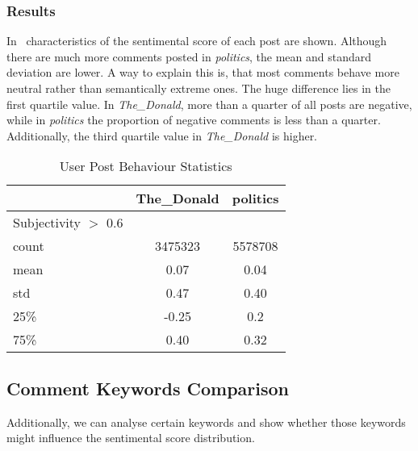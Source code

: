 \documentclass[runningheads,a4paper]{llncs}
\begin{document}
	\subsubsection{Results}
	In~ characteristics of the sentimental score of each post are shown. Although there are much more comments posted in \textit{politics}, the mean and standard deviation are lower. A way to explain this is, that most comments behave more neutral rather than semantically extreme ones. The huge difference lies in the first quartile value. In \textit{The\_Donald}, more than a quarter of all posts are negative, while in \textit{politics} the proportion of negative comments is less than a quarter. Additionally, the third quartile value in \textit{The\_Donald} is higher.
	\begin{table}
		\caption{User Post Behaviour Statistics}
		\centering
		\setlength{\tabcolsep}{5px}
		\begin{tabular}{l | c | c  }
			\hline\hline
			& The\_Donald & politics \\
			\hline
			Subjectivity $>$ 0.6 &    \\
			count &  3475323 & 5578708 \\
			mean  &  0.07    & 0.04 \\
			std   &  0.47    & 0.40 \\
			25\%  & -0.25    & 0.2 \\
			75\%  & 0.40     & 0.32 \\
			\hline\hline
		\end{tabular}
		\label{table:post}
	\end{table}
	\subsection{Comment Keywords Comparison}
	Additionally, we can analyse certain keywords and show whether those keywords might influence the sentimental score distribution.
\end{document}
